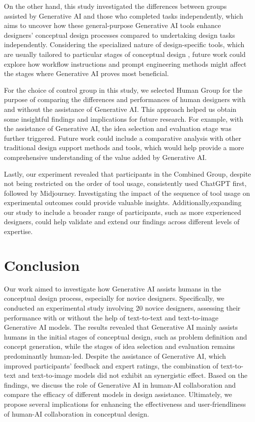 \documentclass{dsj}
\begin{document}
On the other hand, this study investigated the differences between groups assisted by Generative AI and those who completed tasks independently, which aims to uncover how these general-purpose Generative AI tools enhance designers’ conceptual design processes compared to undertaking design tasks independently. Considering the specialized nature of design-specific tools, which are usually tailored to particular stages of conceptual design \citep{lee2024and}, future work could explore how workflow instructions and prompt engineering methods might affect the stages where Generative AI proves most beneficial.

For the choice of control group in this study, we selected Human Group for the purpose of comparing the differences and performances of human designers with and without the assistance of Generative AI. This approach helped us obtain some insightful findings and implications for future research. For example, with the assistance of Generative AI, the idea selection and evaluation stage was further triggered. Future work could include a comparative analysis with other traditional design support methods and tools, which would help provide a more comprehensive understanding of the value added by Generative AI.

Lastly, our experiment revealed that participants in the Combined Group, despite not being restricted on the order of tool usage, consistently used ChatGPT first, followed by Midjourney. Investigating the impact of the sequence of tool usage on experimental outcomes could provide valuable insights. Additionally,expanding our study to include a broader range of participants, such as more experienced designers, could help validate and extend our findings across different levels of expertise.

\section{Conclusion}
Our work aimed to investigate how Generative AI assists humans in the conceptual design process, especially for novice designers. Specifically, we conducted an experimental study involving 20 novice designers, assessing their performance with or without the help of text-to-text and text-to-image Generative AI models. The results revealed that Generative AI mainly assists humans in the initial stages of conceptual design, such as problem definition and concept generation, while the stages of idea selection and evaluation remains predominantly human-led. Despite the assistance of Generative AI, which improved participants’ feedback and expert ratings, the combination of text-to-text and text-to-image models did not exhibit an synergistic effect. Based on the findings, we discuss the role of Generative AI in human-AI collaboration and compare the efficacy of different models in design assistance. Ultimately, we propose several implications for enhancing the effectiveness and user-friendliness of human-AI collaboration in conceptual design. 
\end{document}
